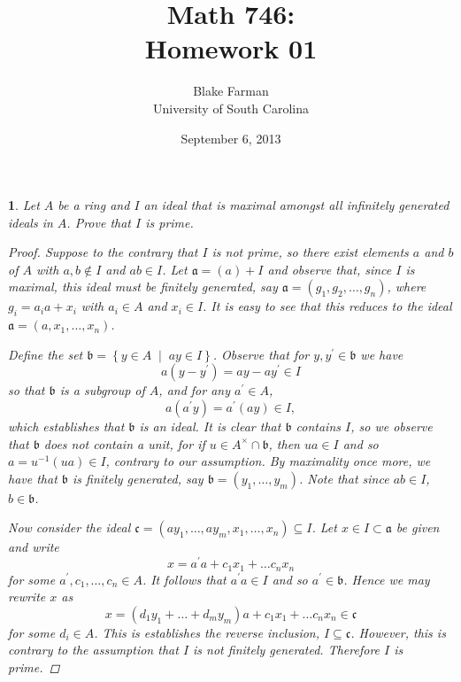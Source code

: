 \documentclass[10pt]{amsart}
\author{Blake Farman\\University of South Carolina}
\title{Math 746:\\Homework 01}
\date{September 6, 2013}
\begin{document}
\maketitle

\providecommand{\p}{\mathfrak{p}}
\providecommand{\m}{\mathfrak{m}}

\newtheorem{thm}{}
\newtheorem{lem}{Lemma}

\begin{thm}
  Let $A$ be a ring and $I$ an ideal that is maximal amongst all infinitely generated ideals in $A$.  Prove that $I$ is prime.
  
  \begin{proof}
    Suppose to the contrary that $I$ is not prime, so there exist elements $a$ and $b$ of $A$ with $a,b \not \in I$ and $ab \in I$.
    Let $\mathfrak{a} = (a) + I$ and observe that, since $I$ is maximal, this ideal must be finitely generated, say $\mathfrak{a} = (g_1, g_2, \ldots, g_n)$, where $g_i = a_ia + x_i$ with $a_i \in A$ and $x_i \in I$.
    It is easy to see that this reduces to the ideal $\mathfrak{a} = (a, x_1, \ldots, x_n)$.
    
    Define the set $\mathfrak{b} = \left\{y \in A \;\middle\vert\; ay \in I \right\}$.
    Observe that for $y, y^\prime \in \mathfrak{b}$ we have 
    $$a(y - y^\prime) = ay - ay^\prime \in I$$ 
    so that $\mathfrak{b}$ is a subgroup of $A$, and for any $a^\prime \in A$, 
    $$a(a^\prime y) = a^\prime(ay) \in I,$$
    which establishes that $\mathfrak{b}$ is an ideal.
    It is clear that $\mathfrak{b}$ contains $I$, so we observe that $\mathfrak{b}$ does not contain a unit, for if $u \in A^\times \cap \mathfrak{b}$, then $ua \in I$ and so $a = u^{-1}(ua) \in I$, contrary to our assumption.
    By maximality once more, we have that $\mathfrak{b}$ is finitely generated, say $\mathfrak{b} = (y_1, \ldots, y_m)$.
    Note that since $ab \in I$, $b \in \mathfrak{b}$.
    
    Now consider the ideal $\mathfrak{c} = (ay_1, \ldots, ay_m, x_1, \ldots, x_n) \subseteq I$.
    Let $x \in I \subset \mathfrak{a}$ be given and write 
    $$x = a^\prime a + c_1x_1 + \ldots c_nx_n$$
    for some $a^\prime, c_1, \ldots, c_n \in A$.
    It follows that $a^\prime a \in I$ and so $a^\prime \in \mathfrak{b}$.
    Hence we may rewrite $x$ as 
    $$x = (d_1y_1 + \ldots + d_my_m)a + c_1x_1 + \ldots c_nx_n \in \mathfrak{c}$$
    for some $d_i \in A$.
    This is establishes the reverse inclusion, $I \subseteq \mathfrak{c}$.
    However, this is contrary to the assumption that $I$ is not finitely generated.
    Therefore $I$ is prime.
  \end{proof}
\end{thm}
\end{document}
